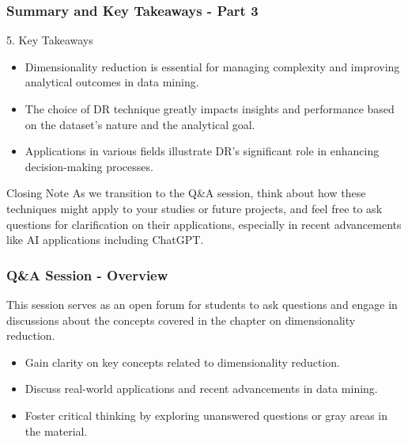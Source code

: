 \documentclass[aspectratio=169]{beamer}
\begin{document}
\begin{frame}[fragile]
    \frametitle{Summary and Key Takeaways - Part 3}
    \begin{block}{5. Key Takeaways}
        \begin{itemize}
            \item Dimensionality reduction is essential for managing complexity and improving analytical outcomes in data mining.
            \item The choice of DR technique greatly impacts insights and performance based on the dataset’s nature and the analytical goal.
            \item Applications in various fields illustrate DR's significant role in enhancing decision-making processes.
        \end{itemize}
    \end{block}

    \begin{block}{Closing Note}
        As we transition to the Q\&A session, think about how these techniques might apply to your studies or future projects, and feel free to ask questions for clarification on their applications, especially in recent advancements like AI applications including ChatGPT.
    \end{block}
\end{frame}

\begin{frame}[fragile]
    \frametitle{Q\&A Session - Overview}
    This session serves as an open forum for students to ask questions and engage in discussions about the concepts covered in the chapter on dimensionality reduction. 
    \begin{itemize}
        \item Gain clarity on key concepts related to dimensionality reduction.
        \item Discuss real-world applications and recent advancements in data mining.
        \item Foster critical thinking by exploring unanswered questions or gray areas in the material.
    \end{itemize}
\end{frame}
\end{document}
